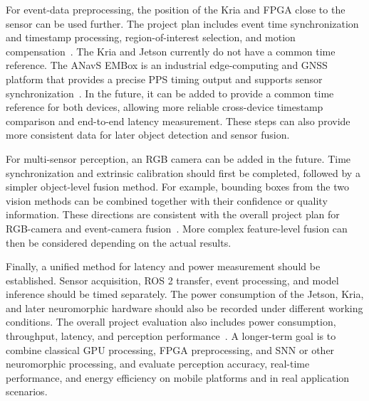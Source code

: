 For event-data preprocessing, the position of the Kria and FPGA close to the sensor can be used further. The project plan includes event time synchronization and timestamp processing, region-of-interest selection, and motion compensation~\parencite{hybridneuroperceptionGVB2025}. The Kria and Jetson currently do not have a common time reference. The ANavS EMBox is an industrial edge-computing and GNSS platform that provides a precise PPS timing output and supports sensor synchronization~\parencite{anavsEmbox}. In the future, it can be added to provide a common time reference for both devices, allowing more reliable cross-device timestamp comparison and end-to-end latency measurement. These steps can also provide more consistent data for later object detection and sensor fusion.

For multi-sensor perception, an RGB camera can be added in the future. Time synchronization and extrinsic calibration should first be completed, followed by a simpler object-level fusion method. For example, bounding boxes from the two vision methods can be combined together with their confidence or quality information. These directions are consistent with the overall project plan for RGB-camera and event-camera fusion~\parencite{hybridneuroperceptionGVB2025}. More complex feature-level fusion can then be considered depending on the actual results.

Finally, a unified method for latency and power measurement should be established. Sensor acquisition, ROS 2 transfer, event processing, and model inference should be timed separately. The power consumption of the Jetson, Kria, and later neuromorphic hardware should also be recorded under different working conditions. The overall project evaluation also includes power consumption, throughput, latency, and perception performance~\parencite{hybridneuroperceptionGVB2025}. A longer-term goal is to combine classical GPU processing, FPGA preprocessing, and SNN or other neuromorphic processing, and evaluate perception accuracy, real-time performance, and energy efficiency on mobile platforms and in real application scenarios.

